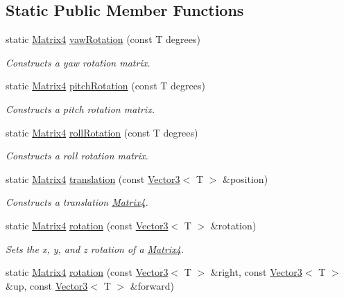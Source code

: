 \subsection*{Static Public Member Functions}
\begin{DoxyCompactItemize}
\item 
static \hyperlink{classsparky_1_1_matrix4}{Matrix4} \hyperlink{classsparky_1_1_matrix4_a564f44ac943b69a310e166296e4bab52}{yaw\+Rotation} (const T degrees)
\begin{DoxyCompactList}\small\item\em Constructs a yaw rotation matrix. \end{DoxyCompactList}\item 
static \hyperlink{classsparky_1_1_matrix4}{Matrix4} \hyperlink{classsparky_1_1_matrix4_aa7950c1de246d237ea8338b61ecf7bfa}{pitch\+Rotation} (const T degrees)
\begin{DoxyCompactList}\small\item\em Constructs a pitch rotation matrix. \end{DoxyCompactList}\item 
static \hyperlink{classsparky_1_1_matrix4}{Matrix4} \hyperlink{classsparky_1_1_matrix4_a91059662a474c2d14e1fa0e84e8f4680}{roll\+Rotation} (const T degrees)
\begin{DoxyCompactList}\small\item\em Constructs a roll rotation matrix. \end{DoxyCompactList}\item 
static \hyperlink{classsparky_1_1_matrix4}{Matrix4} \hyperlink{classsparky_1_1_matrix4_a784f547051f224f748058b573ed87d38}{translation} (const \hyperlink{classsparky_1_1_vector3}{Vector3}$<$ T $>$ \&position)
\begin{DoxyCompactList}\small\item\em Constructs a translation \hyperlink{classsparky_1_1_matrix4}{Matrix4}. \end{DoxyCompactList}\item 
static \hyperlink{classsparky_1_1_matrix4}{Matrix4} \hyperlink{classsparky_1_1_matrix4_a7eb1835e9c95d6aa63641309033717df}{rotation} (const \hyperlink{classsparky_1_1_vector3}{Vector3}$<$ T $>$ \&rotation)
\begin{DoxyCompactList}\small\item\em Sets the x, y, and z rotation of a \hyperlink{classsparky_1_1_matrix4}{Matrix4}. \end{DoxyCompactList}\item 
static \hyperlink{classsparky_1_1_matrix4}{Matrix4} \hyperlink{classsparky_1_1_matrix4_a6d5719c80a7d112489ba85f3d226ac22}{rotation} (const \hyperlink{classsparky_1_1_vector3}{Vector3}$<$ T $>$ \&right, const \hyperlink{classsparky_1_1_vector3}{Vector3}$<$ T $>$ \&up, const \hyperlink{classsparky_1_1_vector3}{Vector3}$<$ T $>$ \&forward)

\end{DoxyCompactItemize}
